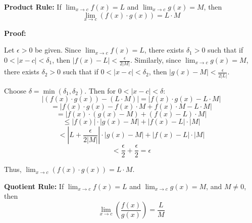 \textbf{Product Rule:} If $\lim_{x \to c} f(x) = L$ and $\lim_{x \to c} g(x) = M$, then
\[ \lim_{x \to c} (f(x) \cdot g(x)) = L \cdot M \]

\textbf{Proof:} \begin{outline}
Let $\epsilon > 0$ be given. Since $\lim_{x \to c} f(x) = L$, there exists $\delta_1 > 0$ such that if $0 < |x - c| < \delta_1$, then $|f(x) - L| < \frac{\epsilon}{2|M|}$.
Similarly, since $\lim_{x \to c} g(x) = M$, there exists $\delta_2 > 0$ such that if $0 < |x - c| < \delta_2$, then $|g(x) - M| < \frac{\epsilon}{2|L|}$.

Choose $\delta = \min(\delta_1, \delta_2)$. Then for $0 < |x - c| < \delta$:
\[ |(f(x) \cdot g(x)) - (L \cdot M)| = |f(x) \cdot g(x) - L \cdot M| \]
\[ = |f(x) \cdot g(x) - f(x) \cdot M + f(x) \cdot M - L \cdot M| \]
\[ = |f(x) \cdot (g(x) - M) + (f(x) - L) \cdot M| \]
\[ \leq |f(x)| \cdot |g(x) - M| + |f(x) - L| \cdot |M| \]
\[ < |L + \frac{\epsilon}{2|M|}| \cdot |g(x) - M| + |f(x) - L| \cdot |M| \]
\[ < \frac{\epsilon}{2} + \frac{\epsilon}{2} = \epsilon \] \quad {}

Thus, $\lim_{x \to c} (f(x) \cdot g(x)) = L \cdot M$.

\end{outline} \vspace{1cm} \hline


\textbf{Quotient Rule:} If $\lim_{x \to c} f(x) = L$ and $\lim_{x \to c} g(x) = M$, and $M \neq 0$, then
\[ \lim_{x \to c} \left(\frac{f(x)}{g(x)}\right) = \frac{L}{M} \]

